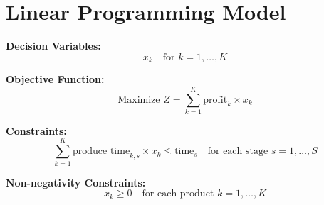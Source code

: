 \documentclass{article}
\begin{document}
\section*{Linear Programming Model}

\textbf{Decision Variables:}
\[
x_k \quad \text{for } k = 1, \ldots, K
\]

\textbf{Objective Function:}
\[
\text{Maximize } Z = \sum_{k=1}^{K} \text{profit}_{k} \times x_k
\]

\textbf{Constraints:}
\[
\sum_{k=1}^{K} \text{produce\_time}_{k, s} \times x_k \leq \text{time}_{s} \quad \text{for each stage } s = 1, \ldots, S
\]

\textbf{Non-negativity Constraints:}
\[
x_k \geq 0 \quad \text{for each product } k = 1, \ldots, K
\]
\end{document}
